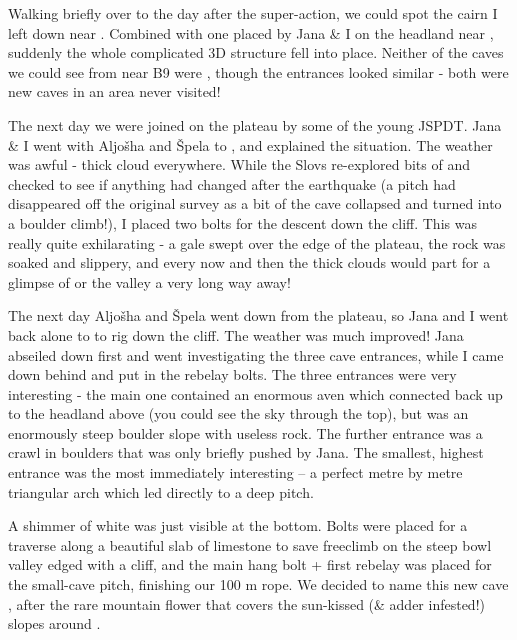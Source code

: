
Walking briefly over to  the day after the super-action, we could spot
the cairn I left down near . Combined with one placed by
Jana \& I on the headland near , suddenly the whole complicated 3D
structure fell into place. Neither of the caves we could see from near
B9 were , though the entrances looked similar - both
were new caves in an area never visited!

The next day we were joined on the plateau by some of the young JSPDT.
Jana \& I went with Aljošha and Špela to , and explained the
situation. The weather was awful - thick cloud everywhere. While the
Slovs re-explored bits of  and checked to see if anything had changed
after the earthquake (a pitch had disappeared off the original survey as
a bit of the cave collapsed and turned into a boulder climb!), I placed
two bolts for the descent down the cliff. This was really quite
exhilarating - a gale swept over the edge of the plateau, the rock was
soaked and slippery, and every now and then the thick clouds would part
for a glimpse of  or the  valley a very long way away!

The next day Aljošha and Špela went down from the plateau, so Jana and I
went back alone to  to rig down the cliff. The weather was much
improved! Jana abseiled down first and went investigating the three cave
entrances, while I came down behind and put in the rebelay bolts. The
three entrances were very interesting - the main one contained an
enormous aven which connected back up to the headland above  (you
could see the sky through the top), but was an enormously steep boulder
slope with useless rock. The further entrance was a crawl in boulders
that was only briefly pushed by Jana. The smallest, highest entrance was
the most immediately interesting -- a perfect metre by metre triangular
arch which led directly to a deep pitch. 

A shimmer of white was just
visible at the bottom. Bolts were placed for a traverse along a
beautiful slab of limestone to save freeclimb on the steep bowl valley
edged with a cliff, and the main hang bolt + first rebelay was placed
for the small-cave pitch, finishing our 100 m rope. We decided to name
this new cave , after the rare mountain flower that covers
the sun-kissed (\& adder infested!) slopes around .

